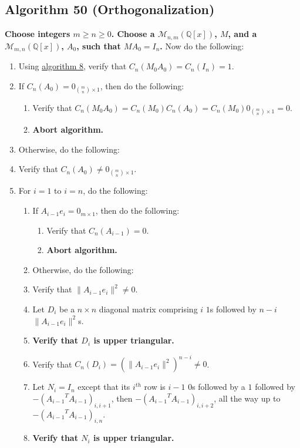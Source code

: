 \documentclass[twocolumn]{article}
\begin{document}
		\subsection{Algorithm 50 (Orthogonalization)}\label{sec:algorithm 50}
			\textbf{Choose integers $m\ge n\ge 0$. Choose a $\mathcal{M}_{n,m}(\mathbb{Q}[x])$, $M$, and a $\mathcal{M}_{m,n}(\mathbb{Q}[x])$, $A_0$, such that $MA_0=I_n$.} Now do the following:
			\begin{enumerate}
				\item Using \hyperref[sec:algorithm 8]{algorithm 8}, verify that $C_n(M_0A_0)=C_n(I_n)=1$.
				\item If $C_n(A_0)=0_{\binom{m}{n}\times 1}$, then do the following:
				\begin{enumerate}
					\item Verify that $C_n(M_0A_0)=C_n(M_0)C_n(A_0)=C_n(M_0)0_{\binom{m}{n}\times 1}=0$.
					\item \textbf{Abort algorithm.}
				\end{enumerate}
				\item Otherwise, do the following:
				\item Verify that $C_n(A_0)\ne0_{\binom{m}{n}\times 1}$.
				\item For $i=1$ to $i=n$, do the following:
				\begin{enumerate}
					\item If $A_{i-1}e_i=0_{m\times 1}$, then do the following:
					\begin{enumerate}
						\item Verify that $C_n(A_{i-1})=0$.
						\item \textbf{Abort algorithm.}
					\end{enumerate}
					\item Otherwise, do the following:
					\item Verify that $\lVert A_{i-1}e_i\rVert^2\ne 0$.
					\item Let $D_i$ be a $n\times n$ diagonal matrix comprising $i$ $1$s followed by $n-i$ $\lVert A_{i-1}e_i\rVert^2$s.
					\item \textbf{Verify that $D_i$ is upper triangular.}
					\item Verify that $C_n(D_i)=(\lVert A_{i-1}e_i\rVert^2)^{n-i}\ne 0$.
					\item Let $N_i=I_n$ except that its $i^{th}$ row is $i-1$ $0$s followed by a $1$ followed by $-({A_{i-1}}^TA_{i-1})_{i,i+1}$, then $-({A_{i-1}}^TA_{i-1})_{i,i+2}$, all the way up to $-({A_{i-1}}^TA_{i-1})_{i,n}$.
					\item \textbf{Verify that $N_i$ is upper triangular.}

\end{enumerate}
\end{enumerate}
\end{document}
